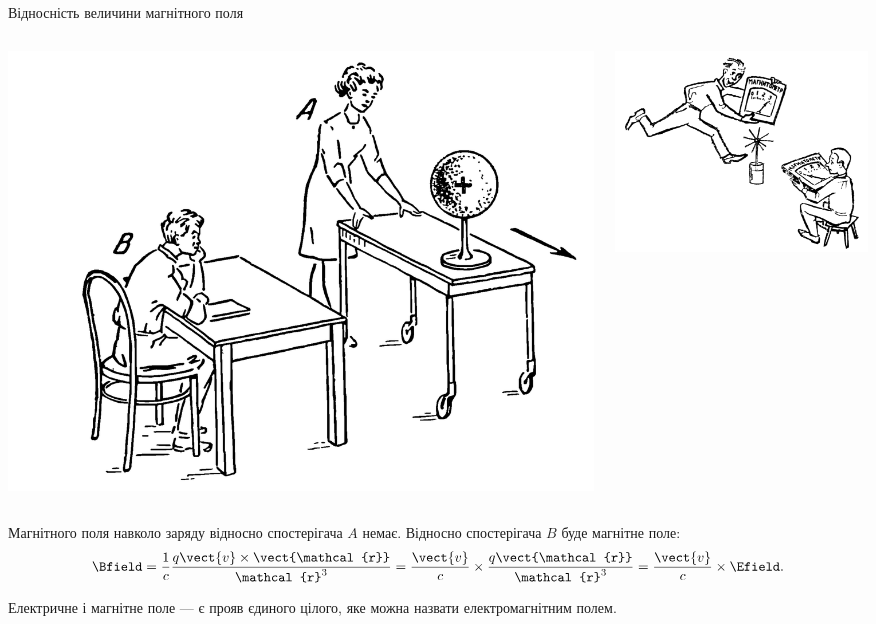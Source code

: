 \documentclass{beamer}
\begin{document}
\begin{frame}{Відносність величини магнітного поля}{}
	\begin{columns}
		\begin{column}{0.5\linewidth}
			\includegraphics[width=0.85\linewidth]{MagFieldRelativity}
		\end{column}
		\begin{column}{0.5\linewidth}
			\includegraphics[width=0.85\linewidth]{MagFieldRelativity2}
		\end{column}
	\end{columns}
	\begin{block}{}
		Магнітного поля навколо заряду відносно спостерігача $A$ немає. Відносно спостерігача $B$ буде магнітне поле:
		\begin{equation*}
			\Bfield = \frac1c \frac{q\vect{v}\times\vect{\mathcal{r}}}{\mathcal{r}^3} =
			\frac{\vect{v}}{c}\times\frac{q\vect{\mathcal{r}}}{\mathcal{r}^3} = \frac{\vect{v}}{c}\times\Efield.
		\end{equation*}
	\end{block}
\begin{alertblock}{}\centering
    Електричне і магнітне поле --- є прояв єдиного цілого, яке можна назвати \alert{електромагнітним полем}.
\end{alertblock}
\end{frame}
\end{document}
